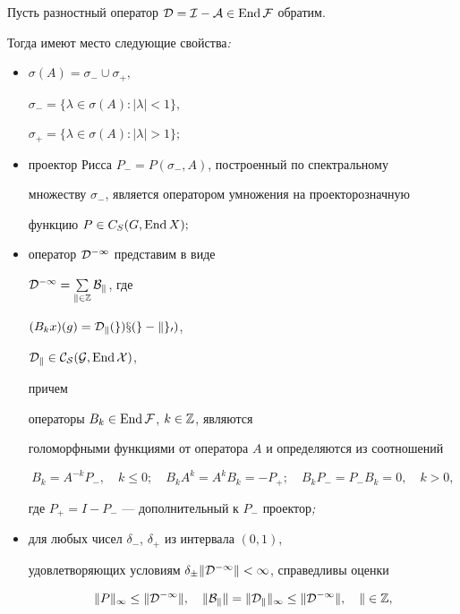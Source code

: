 \begin{thm} Пусть разностный оператор $\cal D=I-A\in\operatorname{End}\cal F$ обратим. 


Тогда имеют место следующие свойства{\em :} 


\begin{itemize} 


\item[1)] $\sigma(A)=\sigma_-\cup\sigma_+,$ 


$\sigma_-=\{\lambda\in\sigma(A):|\lambda|<1\},$ 


$\sigma_+=\{\lambda\in\sigma(A):|\lambda|>1\};$ 


\item[2)] проектор Рисса $P_-=P(\sigma_-,A)$, построенный по спектральному 


множеству $\sigma_-$, является оператором умножения на проекторозначную 


функцию $P\in C_S(G,\operatorname{End} X);$ 


\item[3)] оператор $\cal D^{-1}$ представим в виде 


$\cal D^{-1}=\sum\limits_{k\in\Bbb Z}B_k$, где 


$(B_kx)(g)=\cal D_k(g)x(g-kg_0)$, 


$\cal D_k\in C_S(G,\operatorname{End} X)$, 


причем 


операторы $B_k\in\operatorname{End}\cal F$, $k\in\Bbb Z$, являются 


голоморфными функциями от оператора $A$ и определяются из соотношений 


\begin{equation} 


B_k=A^{-k}P_-,\quad k\le 0;\quad B_kA^k=A^kB_k=-P_+;\quad 


B_kP_-=P_-B_k=0,\quad k>0, 


\end{equation} 


где $P_+=I-P_-$ --- дополнительный к $P_-$ проектор{\em ;} 


\item[4)] для любых чисел $\delta_-$, $\delta_+$ из интервала $(0,1)$, 


удовлетворяющих условиям $\delta_\pm\|\cal D^{-1}\|<1$, справедливы оценки 


\begin{gather} 


\|P\|_\infty\le \|\cal D^{-1}\|,\quad \|B_k\|=\|\cal D_k\|_\infty \le 


\|\cal D^{-1}\|,\quad k\in\Bbb Z,\\ 



\end{gather}
\end{itemize}
\end{thm}
